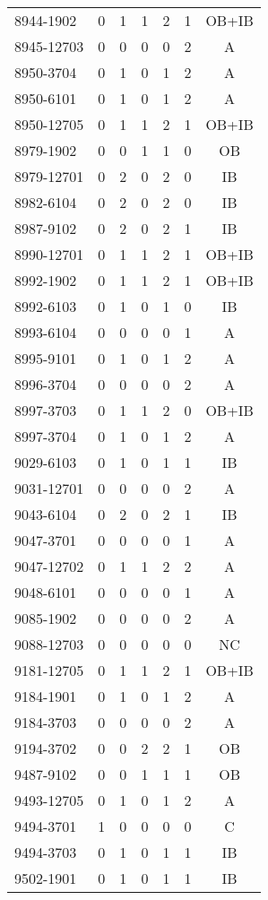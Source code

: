 \begin{longtable}[c]{lcccccc}
8944-1902 & 0 & 1 & 1 & 2 & 1 & OB+IB \\
8945-12703 & 0 & 0 & 0 & 0 & 2 & A \\
8950-3704 & 0 & 1 & 0 & 1 & 2 & A \\
8950-6101 & 0 & 1 & 0 & 1 & 2 & A \\
8950-12705 & 0 & 1 & 1 & 2 & 1 & OB+IB \\
8979-1902 & 0 & 0 & 1 & 1 & 0 & OB \\
8979-12701 & 0 & 2 & 0 & 2 & 0 & IB \\
8982-6104 & 0 & 2 & 0 & 2 & 0 & IB \\
8987-9102 & 0 & 2 & 0 & 2 & 1 & IB \\
8990-12701 & 0 & 1 & 1 & 2 & 1 & OB+IB \\
8992-1902 & 0 & 1 & 1 & 2 & 1 & OB+IB \\
8992-6103 & 0 & 1 & 0 & 1 & 0 & IB \\
8993-6104 & 0 & 0 & 0 & 0 & 1 & A \\
8995-9101 & 0 & 1 & 0 & 1 & 2 & A \\
8996-3704 & 0 & 0 & 0 & 0 & 2 & A \\
8997-3703 & 0 & 1 & 1 & 2 & 0 & OB+IB \\
8997-3704 & 0 & 1 & 0 & 1 & 2 & A \\
9029-6103 & 0 & 1 & 0 & 1 & 1 & IB \\
9031-12701 & 0 & 0 & 0 & 0 & 2 & A \\
9043-6104 & 0 & 2 & 0 & 2 & 1 & IB \\
9047-3701 & 0 & 0 & 0 & 0 & 1 & A \\
9047-12702 & 0 & 1 & 1 & 2 & 2 & A \\
9048-6101 & 0 & 0 & 0 & 0 & 1 & A \\
9085-1902 & 0 & 0 & 0 & 0 & 2 & A \\
9088-12703 & 0 & 0 & 0 & 0 & 0 & NC \\
9181-12705 & 0 & 1 & 1 & 2 & 1 & OB+IB \\
9184-1901 & 0 & 1 & 0 & 1 & 2 & A \\
9184-3703 & 0 & 0 & 0 & 0 & 2 & A \\
9194-3702 & 0 & 0 & 2 & 2 & 1 & OB \\
9487-9102 & 0 & 0 & 1 & 1 & 1 & OB \\
9493-12705 & 0 & 1 & 0 & 1 & 2 & A \\
9494-3701 & 1 & 0 & 0 & 0 & 0 & C \\
9494-3703 & 0 & 1 & 0 & 1 & 1 & IB \\
9502-1901 & 0 & 1 & 0 & 1 & 1 & IB \\

\end{longtable}
